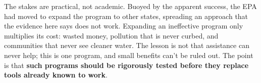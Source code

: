 \documentclass[
  11pt,
]{article}
\begin{document}
\vspace{4pt}

\noindent The stakes are practical, not academic. Buoyed by the apparent success, the EPA had moved to expand the program to other states, spreading an approach that the evidence here says does not work. Expanding an ineffective program only multiplies its cost: wasted money, pollution that is never curbed, and communities that never see cleaner water. The lesson is not that assistance can never help; this is one program, and small benefits can't be ruled out. The point is that \textbf{such programs should be rigorously tested before they replace tools already known to work}.
\end{document}
